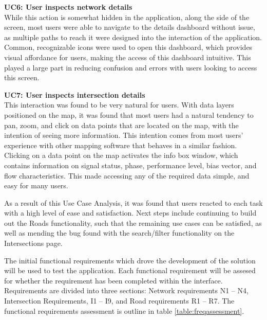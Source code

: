 \documentclass{report}
\begin{document}
\noindent \textbf{UC6: User inspects network details} \\
While this action is somewhat hidden in the application, along the side of the screen, most users were able to navigate to the details dashboard without issue, as multiple paths to reach it were designed into the interaction of the application.
Common, recognizable icons were used to open this dashboard, which provides visual affordance for users, making the access of this dashboard intuitive.
This played a large part in reducing confusion and errors with users looking to access this screen.

\noindent \textbf{UC7: User inspects intersection details} \\
This interaction was found to be very natural for users.
With data layers positioned on the map, it was found that most users had a natural tendency to pan, zoom, and click on data points that are located on the map, with the intention of seeing more information.
This intention comes from most users' experience with other mapping software that behaves in a similar fashion.
Clicking on a data point on the map activates the info box window, which contains information on signal status, phase, performance level, bias vector, and flow characteristics.
This made accessing any of the required data simple, and easy for many users.

As a result of this Use Case Analysis, it was found that users reacted to each task with a high level of ease and satisfaction.
Next steps include continuing to build out the Roads functionality, such that the remaining use cases can be satisfied, as well as mending the bug found with the search/filter functionality on the Intersections page.

The initial functional requirements which drove the development of the solution will be used to test the application. Each functional requirement will be assesed for whether the requirement has been completed within the interface. Requirements are divided into three sections: Network requirements N1 -- N4, Intersection Requirements, I1 -- I9, and Road requirements R1 -- R7. The functional requirements assessment is outline in table \ref{table:freqassessment}.
\end{document}
